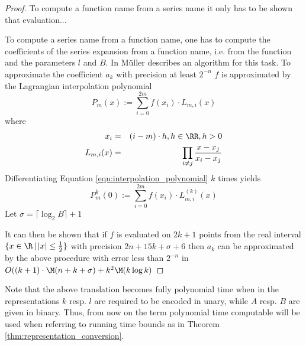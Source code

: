 	 \begin{proof}
	 	To compute a function name from a series name it only has to be shown that evaluation...

	 	To compute a series name from a function name, one has to compute the coefficients of the series expansion from a function name, i.e. from the function and the parameters $l$ and $B$.
	 	In \cite{Mue} M\"uller describes an algorithm for this task.
	 	To approximate the coefficient $a_k$ with precision at least $2^{-n}$ $f$ is approximated by the Lagrangian interpolation
	 	polynomial
	 	\begin{equation}\label{eqn:interpolation_polynomial}
	 		P_m(x)  :=  \sum_{i=0}^{2m} f(x_i) \cdot L_{m,i}(x) 
	 	\end{equation}
	 	where
	 	\begin{eqnarray*}
	 		x_i & = & (i-m) \cdot h , h \in \RR, h > 0 \\
	 		L_{m,i}(x) & = & \prod_{i \neq j} \frac{x-x_j}{x_i-x_j} 
	 	\end{eqnarray*}
	 	Differentiating Equation \ref{eqn:interpolation_polynomial} $k$ times yields
	 	\begin{equation}\label{eqn:interpolation_polynomial_diff}
	 		P_m^k(0)  :=  \sum_{i=0}^{2m} f(x_i) \cdot L_{m,i}^{(k)}(x) 
	 	\end{equation}
	 	Let $\sigma = \lceil \log_2 B \rceil + 1$

	 	It can then be shown that if $f$ is evaluated on $2k+1$ points from the 
	 	real interval $\{x \in \R \,|\, |x| \leq \frac{1}{2}\}$ with precision $2n+15k+\sigma+6$ 
	 	then $a_k$ can be approximated by the above procedure with error less than $2^{-n}$ in 
	 	$O((k+1)\cdot \M(n+k+\sigma) + k^2 \M (k \log k)$

	 \end{proof}
	 Note that the above translation becomes fully polynomial time when in the representations $k$ resp. $l$ are required to be encoded in unary, while $A$ resp. $B$ are given in binary.
	 Thus, from now on the term polynomial time computable will be used when referring to running time bounds as in Theorem \ref{thm:representation_conversion}.
